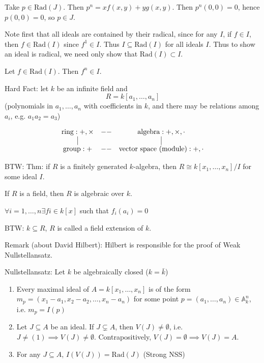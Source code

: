 \documentclass[12pt]{article}
\newcommand{\A}{\mathbb{A}}
\newcommand{\Rad}{\text{Rad}}
\begin{document}
\begin{enumerate}
Take $p\in \Rad(J)$.  Then $p^n = xf(x,y)+yg(x,y)$.  Then $p^n(0,0)=0$, hence $p(0,0)=0$, so $p\in J$.

 	
 	Note first that all ideals are contained by their radical, since for any $I$, if $f\in I$, then $f\in \Rad(I)$ since $f^1 \in I$.  Thus $I\subseteq \Rad (I)$ for all ideals $I$.  Thus to show an ideal is radical, we need only show that $\Rad(I) \subset I$.  
 	
 	Let $f\in \Rad(I)$.  Then $f^n \in I$.  
 	

   
\end{enumerate}


Hard Fact: let $k$ be an infinite field and
\[R=k[a_1,\dots,a_n]\]
(polynomials in $a_1,\dots,a_n$ with coefficients in $k$, and there may be relations among $a_i$, e.g. $a_1a_2=a_3$)
   
   \[\begin{matrix}
   \text{ring}: +,\times & -- &\text{algebra}: +,\times,\cdot \\
	\vline & ~ & \vline \\   
    \text{group}: + & -- & \text{vector space (module)}: +,\cdot
   \end{matrix}\]
   
   BTW: Thm: if $R$ is a finitely generated $k$-algebra, then $R\cong k[x_1,\dots,x_n]/I$ for some ideal $I$.
   
   If $R$ is a field, then $R$ is algebraic over $k$.
   
   $\forall i=1,\dots,n \exists fi\in k[x]$ such that $f_i(a_i)=0$
   
   BTW: $k\subseteq R$, $R$ is called a field extension of $k$.
   
   Remark (about David Hilbert): Hilbert is responsible for the proof of Weak Nullstellansatz.
   
   Nullstellansatz: Let $k$ be algebraically closed ($k=\bar{k}$)
   \begin{enumerate}
   \item Every maximal ideal of $A=k[x_1,\dots,x_n]$ is of the form $m_p=(x_1-a_1, x_2-a_2,\dots, x_n-a_n)$ 
   for some point $p=(a_1,\dots,a_n) \in \A^n_k$, i.e. $m_p=I(p)$
   \item Let $J\subseteq A$ be an ideal.  If $J\subsetneq A$, then $V(J)\neq \emptyset$, i.e. $J\neq (1) \implies V(J)\neq \emptyset$.  Contrapositively, $V(J)=\emptyset \implies V(J)=A$. 
   \item For any $J\subseteq A$, $I(V(J))=\Rad(J)$ (Strong NSS)
   \end{enumerate}
   
\end{document}
